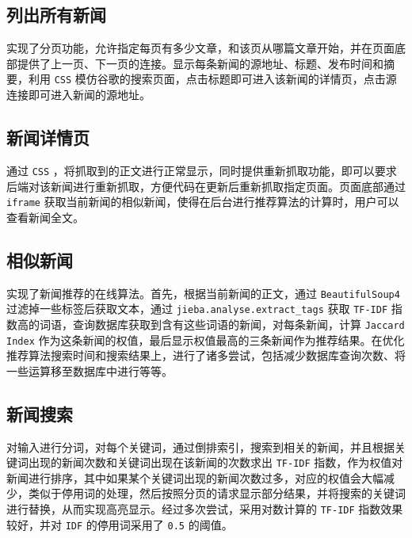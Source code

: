 \documentclass[11pt]{article}
\begin{document}
\subsection{列出所有新闻}
\label{sec:org0f2fec9}
实现了分页功能，允许指定每页有多少文章，和该页从哪篇文章开始，并在页面底部提供了上一页、下一页的连接。显示每条新闻的源地址、标题、发布时间和摘要，利用 \texttt{CSS} 模仿谷歌的搜索页面，点击标题即可进入该新闻的详情页，点击源连接即可进入新闻的源地址。
\subsection{新闻详情页}
\label{sec:org1bec972}
通过 \texttt{CSS} ，将抓取到的正文进行正常显示，同时提供重新抓取功能，即可以要求后端对该新闻进行重新抓取，方便代码在更新后重新抓取指定页面。页面底部通过 \texttt{iframe} 获取当前新闻的相似新闻，使得在后台进行推荐算法的计算时，用户可以查看新闻全文。
\subsection{相似新闻}
\label{sec:org2ece915}
实现了新闻推荐的在线算法。首先，根据当前新闻的正文，通过 \texttt{BeautifulSoup4} 过滤掉一些标签后获取文本，通过 \texttt{jieba.analyse.extract\_tags} 获取 \texttt{TF-IDF} 指数高的词语，查询数据库获取到含有这些词语的新闻，对每条新闻，计算 \texttt{Jaccard Index} 作为这条新闻的权值，最后显示权值最高的三条新闻作为推荐结果。在优化推荐算法搜索时间和搜索结果上，进行了诸多尝试，包括减少数据库查询次数、将一些运算移至数据库中进行等等。
\subsection{新闻搜索}
\label{sec:orgbcde21c}
对输入进行分词，对每个关键词，通过倒排索引，搜索到相关的新闻，并且根据关键词出现的新闻次数和关键词出现在该新闻的次数求出 \texttt{TF-IDF} 指数，作为权值对新闻进行排序，其中如果某个关键词出现的新闻次数过多，对应的权值会大幅减少，类似于停用词的处理，然后按照分页的请求显示部分结果，并将搜索的关键词进行替换，从而实现高亮显示。经过多次尝试，采用对数计算的 \texttt{TF-IDF} 指数效果较好，并对 \texttt{IDF} 的停用词采用了 \texttt{0.5} 的阈值。
\end{document}
